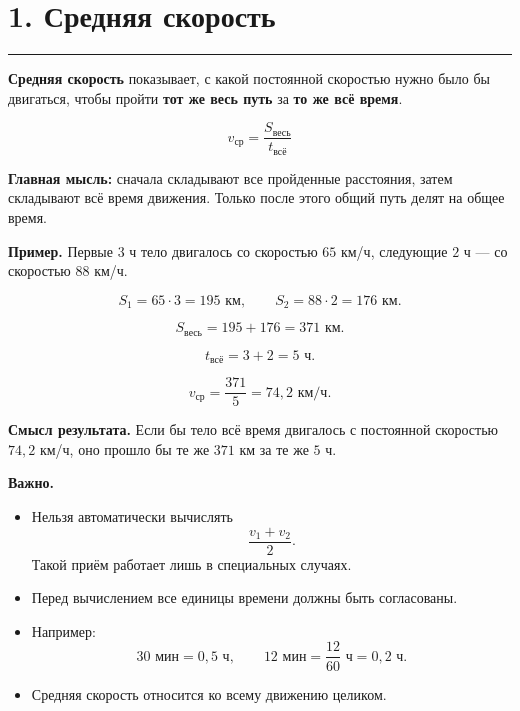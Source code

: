 \documentclass[a4paper,12pt]{article}
\newcommand{\sectionrule}{%
  \par
  \vspace{-0.35em}
  {\color{accent}\rule{\linewidth}{0.7pt}}
  \vspace{0.55em}
}
\newcommand{\key}[1]{\textbf{\color{darkaccent}#1}}
\newcommand{\term}[1]{\textbf{#1}}
\begin{document}

\section*{1. Средняя скорость}
\sectionrule

\term{Средняя скорость} показывает, с какой постоянной скоростью
нужно было бы двигаться, чтобы пройти \key{тот же весь путь}
за \key{то же всё время}.

\[
\boxed{
v_{\text{ср}}
=
\frac{S_{\text{весь}}}{t_{\text{всё}}}
}
\]

\key{Главная мысль:}
сначала складывают все пройденные расстояния,
затем складывают всё время движения.
Только после этого общий путь делят на общее время.

\textbf{Пример.}
Первые $3$ ч тело двигалось со скоростью $65$ км/ч,
следующие $2$ ч --- со скоростью $88$ км/ч.

\[
S_1=65\cdot3=195\text{ км},
\qquad
S_2=88\cdot2=176\text{ км}.
\]

\[
S_{\text{весь}}
=
195+176
=
371\text{ км}.
\]

\[
t_{\text{всё}}
=
3+2
=
5\text{ ч}.
\]

\[
v_{\text{ср}}
=
\frac{371}{5}
=
74{,}2\text{ км/ч}.
\]

\textbf{Смысл результата.}
Если бы тело всё время двигалось с постоянной скоростью
$74{,}2$ км/ч, оно прошло бы те же $371$ км за те же $5$ ч.

\textbf{Важно.}

\begin{itemize}
  \item Нельзя автоматически вычислять
  \[
  \frac{v_1+v_2}{2}.
  \]
  Такой приём работает лишь в специальных случаях.

  \item Перед вычислением все единицы времени должны быть согласованы.

  \item Например:
  \[
  30\text{ мин}=0{,}5\text{ ч},
  \qquad
  12\text{ мин}=\frac{12}{60}\text{ ч}=0{,}2\text{ ч}.
  \]

  \item Средняя скорость относится ко всему движению целиком.
\end{itemize}

\end{document}
